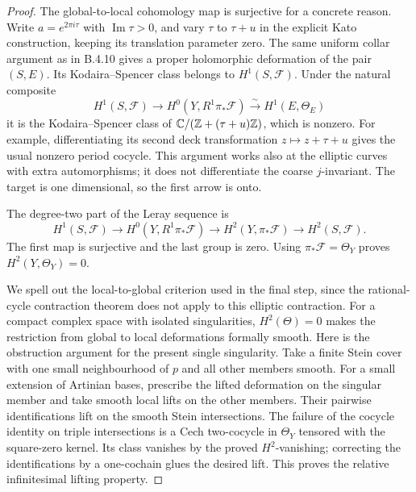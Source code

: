 \begin{proof}
The global-to-local cohomology map is surjective for a concrete
reason.  Write $a=e^{2\pi i\tau}$ with $\operatorname{Im}\tau>0$,
and vary $\tau$ to $\tau+u$ in the explicit Kato construction,
keeping its translation parameter zero.
The same uniform collar argument as in B.4.10 gives a proper
holomorphic deformation of the pair $(S,E)$.
Its Kodaira--Spencer class belongs to $H^1(S,\mathcal F)$.
Under the natural composite
\[
 H^1(S,\mathcal F)\longrightarrow
 H^0(Y,R^1\pi_*\mathcal F)
 \xrightarrow{\ \sim\ }H^1(E,\Theta_E)
\]
it is the Kodaira--Spencer class of
$\mathbb C/(\mathbb Z+(\tau+u)\mathbb Z)$, which is nonzero.
For example, differentiating its second deck transformation
$z\mapsto z+\tau+u$ gives the usual nonzero period cocycle.
This argument works also at the elliptic curves with extra
automorphisms; it does not differentiate the coarse $j$-invariant.
The target is one dimensional, so the first arrow is onto.

The degree-two part of the Leray sequence is
\[
 H^1(S,\mathcal F)\longrightarrow
 H^0(Y,R^1\pi_*\mathcal F)\longrightarrow
 H^2(Y,\pi_*\mathcal F)\longrightarrow H^2(S,\mathcal F).
\]
The first map is surjective and the last group is zero.
Using $\pi_*\mathcal F=\Theta_Y$ proves
$H^2(Y,\Theta_Y)=0$.

We spell out the local-to-global criterion used in the final
step, since the rational-cycle contraction theorem does not
apply to this elliptic contraction.
For a compact complex space with isolated singularities,
$H^2(\Theta)=0$ makes the restriction from global to local
deformations formally smooth.
Here is the obstruction argument for the present single
singularity.  Take a finite Stein cover with one small
neighbourhood of $p$ and all other members smooth.
For a small extension of Artinian bases, prescribe the lifted
deformation on the singular member and take smooth local
lifts on the other members.  Their pairwise identifications
lift on the smooth Stein intersections.  The failure of the
cocycle identity on triple intersections is a Cech two-cocycle
in $\Theta_Y$ tensored with the square-zero kernel.
Its class vanishes by the proved $H^2$-vanishing; correcting
the identifications by a one-cochain glues the desired lift.
This proves the relative infinitesimal lifting property.


\end{proof}
